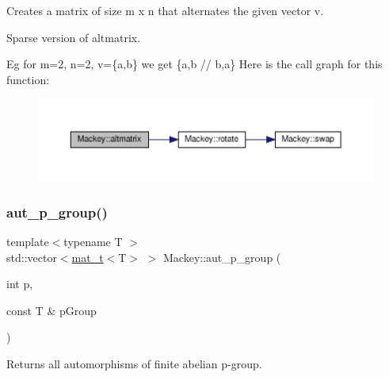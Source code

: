 Creates a matrix of size m x n that alternates the given vector v. 

Sparse version of altmatrix.

Eg for m=2, n=2, v=\{a,b\} we get \{a,b // b,a\} Here is the call graph for this function\+:\nopagebreak
\begin{figure}[H]
\begin{center}
\leavevmode
\includegraphics[width=350pt]{namespaceMackey_aa2f105c9bcbec7f5c7524027174340a0_cgraph}
\end{center}
\end{figure}
\mbox{\label{namespaceMackey_a918f02198f6daadfd0c93109b63b2f1f}} 
\subsubsection{\texorpdfstring{aut\+\_\+p\+\_\+group()}{aut\_p\_group()}}
{\footnotesize\ttfamily template$<$typename T $>$ \\
std\+::vector$<$\hyperlink{namespaceMackey_a035386035757dade630f685e508e5cf9}{mat\+\_\+t}$<$T$>$ $>$ Mackey\+::aut\+\_\+p\+\_\+group (\begin{DoxyParamCaption}\item[{int}]{p,  }\item[{const T \&}]{p\+Group }\end{DoxyParamCaption})}



Returns all automorphisms of finite abelian p-\/group. 

